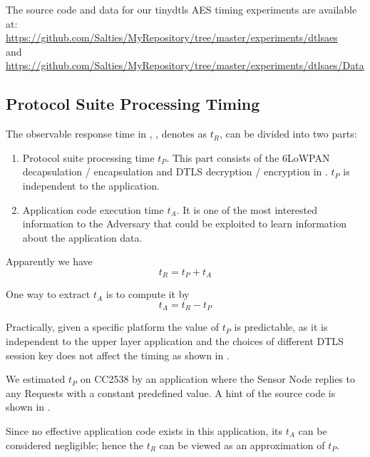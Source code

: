 The source code and data for our tinydtls AES timing experiments are available at: \\
\url{https://github.com/Salties/MyRepository/tree/master/experiments/dtlsaes} \\
and \\
\url{https://github.com/Salties/MyRepository/tree/master/experiments/dtlsaes/Data}

\subsection{Protocol Suite Processing Timing} \label{Protocol Suite Processing Time}

The observable response time in , , denotes as $t_R$, can be divided into two parts:

\begin{enumerate}
	\item Protocol suite processing time $t_P$. This part consists of the 6LoWPAN decapsulation / encapsulation and DTLS decryption / encryption in . $t_P$ is independent to the application. 
	\item Application code execution time $t_A$. It is one of the most interested information to the Adversary that could be exploited to learn information about the application data.
\end{enumerate}

Apparently we have
\begin{equation}
t_R = t_P + t_A
\end{equation}

One way to extract $t_A$ is to compute it by 
\begin{equation} \label{Eq: t_A}
t_A = t_R - t_P
\end{equation}

Practically, given a specific platform the value of $t_P$ is predictable, as it is independent to the upper layer application and the choices of different DTLS session key does not affect the timing as shown in . 

We estimated $t_P$ on CC2538 by an application where the Sensor Node replies to any Requests with a constant predefined value. A hint of the source code is shown in .

 

Since no effective application code exists in this application, its $t_A$ can be considered negligible; hence the $t_R$ can be viewed as an approximation of $t_P$.

